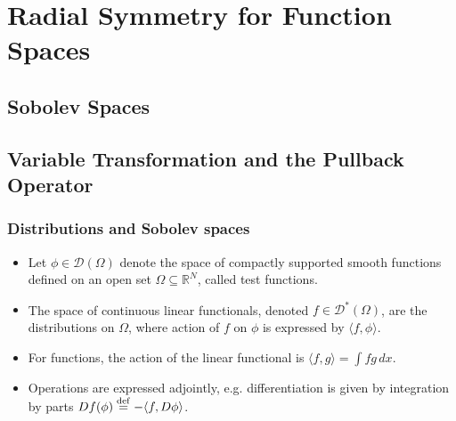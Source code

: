 \documentclass[]{beamer}
\newcommand{\eps}{\varepsilon}
\newcommand{\R}{\ensuremath{\mathbb R}}  %
\newcommand{\DD}{\ensuremath{\mathscr D}}
\newcommand{\eqdef}{\stackrel{\rm def}{=}}
\newcommand{\bm}[1]{\mbox{\boldmath$#1$}}
\newcommand{\vect}[1]{\bm{#1}}
\begin{document}


\section{Radial Symmetry for Function Spaces}
\subsection{Sobolev Spaces}
\subsection{Variable Transformation and the Pullback Operator}
\begin{frame}[t]
  \frametitle{Distributions and Sobolev spaces}
  \begin{itemize}
    \itemsep 1.2em
  \item Let $\phi \in \DD(\Omega)$ denote the space of compactly supported smooth functions defined on an open set $\Omega \subseteq \R^N$, called \alert{test functions}.
  \item The space of continuous linear functionals, denoted $f \in \DD^*(\Omega)$, are the \alert{distributions} on $\Omega$, where action of $f$ on $\phi$ is expressed by \alert{$\langle f, \phi\rangle$}.
  \item For functions, the action of the linear functional is \alert{$\langle f,g\rangle = \int f g\,dx$}.
  \item Operations are expressed adjointly, e.g. differentiation is given by integration by parts \alert{$Df(\phi) \eqdef -\langle f, D\phi \rangle$}.
  \end{itemize}
\end{frame}
\end{document}
